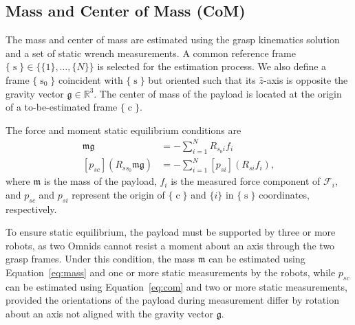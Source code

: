\documentclass[letterpaper, 10 pt, journal, twoside]{IEEEtran}
\newcommand{\real}{\mathbb{R}}
\newcommand{\wrench}{{\mathcal F}}
\newcommand{\mass}{{\mathfrak{m}}}
\newcommand{\grav}{{\mathfrak{g}}}
\newcommand{\frames}{\operatorname{s}}
\newcommand{\framec}{\operatorname{c}}
\begin{document}
\subsection{Mass and Center of Mass (CoM)}
\label{ssec:com}

The mass and center of mass are estimated using the grasp kinematics solution and a set of static wrench measurements.
A common reference frame $\{\frames\} \in \{\{1\}, \ldots , \{N\}\}$ is selected for the estimation process. We also define a frame $\{\frames_0\}$ coincident with $\{\frames\}$ but oriented such that its $\hat{z}$-axis is opposite the gravity vector $\grav \in \real^3$. The center of mass of the payload is located at the origin of a to-be-estimated frame $\{\framec\}$.

The force and moment static equilibrium conditions are
\begin{align}
\mass \grav &= - \sum\limits_{i=1}^{N} R_{s_0i} f_i
\label{eq:mass} \\
[p_{sc}]  ({R_{ss_0}} \mass \grav) &=- \sum\limits_{i=1}^{N} [p_{si}] (R_{si}f_i),
\label{eq:com}
\end{align}
where $\mass$ is the mass of the payload, $f_i$ is the measured force component of $\wrench_i$, and $p_{sc}$ and $p_{si}$ represent the origin of $\{\framec\}$ and $\{i\}$ in $\{\frames\}$ coordinates, respectively. %

To ensure static equilibrium, the payload must be supported by three or more robots, as two Omnids cannot resist a moment about an axis through the two grasp frames. Under this condition, the mass $\mass$ can be estimated using Equation~\eqref{eq:mass} and one or more static measurements by the robots, while $p_{sc}$ can be estimated using Equation~\eqref{eq:com} and two or more static measurements, provided the orientations of the payload during measurement differ by rotation about an axis not aligned with the gravity vector $\grav$.
\end{document}
